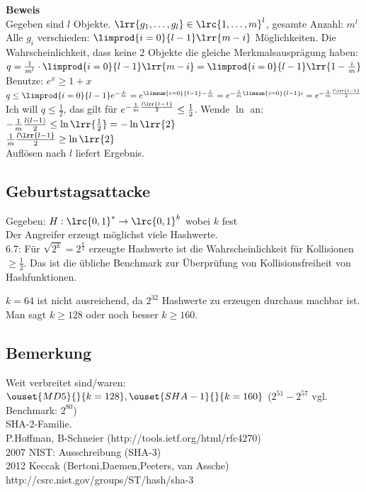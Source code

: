 		\textbf{Beweis}\\
		Gegeben sind $l$ Objekte. $\lrr{g_1,\dots,g_l}\in\lrc{1,\dots,m}^l$, gesamte Anzahl: $m^l$\\
		Alle $g_i$ verschieden: $\limprod{i=0}{l-1}\lrr{m-i}$ Möglichkeiten. Die Wahrscheinlichkeit, dass keine $2$ Objekte die gleiche Merkmalsausprägung haben: $q=\frac{1}{m^l}\cdot\limprod{i=0}{l-1}\lrr{m-i}=\limprod{i=0}{l-1}\lrr{1-\frac{i}{m}}$\\
		Benutze: $e^x\geq 1+x$\\
		$q\leq\limprod{i=0}{l-1}e^{-\frac{i}{m}}=e^{\limsum{i=0}{l-1}-\frac{l}{m}}=e^{-\frac{1}{m}\limsum{i=0}{l-1}i}=e^{-\frac{1}{m}\frac{l\lrr{l-1}}{2}}$\\
		Ich will $q\leq\frac{1}{2}$, das gilt für $e^{-\frac{1}{m}\frac{l\lrr{l-1}}{2}}\leq\frac{1}{2}$. Wende $\ln$ an:\\
		$-\frac{1}{m}\frac{l(l-1)}{2}\leq\ln\lrr{\frac{1}{2}}=-\ln\lrr{2}$\\
		$\frac{1}{m}\frac{l\lrr{l-1}}{2}\geq\ln\lrr{2}$\\
		Auflösen nach $l$ liefert Ergebnis.

	\subsection{Geburtstagsattacke}
		Gegeben: $H:\lrc{0,1}^*\rightarrow\lrc{0,1}^k$ wobei $k$ fest\\
		Der Angreifer erzeugt möglichst viele Hashwerte.\\
		6.7: Für $\sqrt{2^k}=2^{\frac{k}{2}}$ erzeugte Hashwerte ist die Wahrscheinlichkeit für Kollisionen $\geq\frac{1}{2}$. Das ist die übliche Benchmark zur Überprüfung von Kollisionsfreiheit von Hashfunktionen.
	
		$k=64$ ist nicht ausreichend, da $2^{32}$ Hashwerte zu erzeugen durchaus machbar ist. Man sagt $k\geq 128$ oder noch besser $k\geq 160$.
	
	\subsection{Bemerkung}
		Weit verbreitet sind/waren: $\ouset{MD5}{}{k=128}, \ouset{SHA-1}{}{k=160}$ ($2^{51}-2^{57}$ vgl. Benchmark: $2^{80}$)\\
		SHA-2-Familie.\\
		P.Hoffman, B-Schneier (http://tools.ietf.org/html/rfc4270)\\
		2007 NIST: Ausschreibung (SHA-3)\\
		2012 Keccak (Bertoni,Daemen,Peeters, van Assche)\\
		http://csrc.nist.gov/groups/ST/hash/sha-3
	
